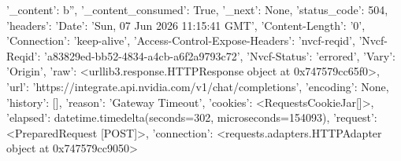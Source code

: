 
{'_content': b'', '_content_consumed': True, '_next': None, 'status_code': 504, 'headers': {'Date': 'Sun, 07 Jun 2026 11:15:41 GMT', 'Content-Length': '0', 'Connection': 'keep-alive', 'Access-Control-Expose-Headers': 'nvcf-reqid', 'Nvcf-Reqid': 'a83829ed-bb52-4834-a4cb-a6f2a9793c72', 'Nvcf-Status': 'errored', 'Vary': 'Origin'}, 'raw': <urllib3.response.HTTPResponse object at 0x747579cc65f0>, 'url': 'https://integrate.api.nvidia.com/v1/chat/completions', 'encoding': None, 'history': [], 'reason': 'Gateway Timeout', 'cookies': <RequestsCookieJar[]>, 'elapsed': datetime.timedelta(seconds=302, microseconds=154093), 'request': <PreparedRequest [POST]>, 'connection': <requests.adapters.HTTPAdapter object at 0x747579cc9050>}
